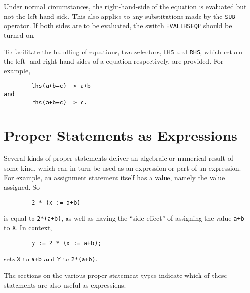 Under normal circumstances, the right-hand-side of the equation is
evaluated but not the left-hand-side.  This also applies to any substitutions
made by the {\tt SUB} operator.  If both sides are to be
evaluated, the switch {\tt EVALLHSEQP} should be
turned on.

To facilitate the handling of equations, two selectors, {\tt LHS}
 and {\tt RHS}, which return the left- and
right-hand sides of a equation respectively, are provided.
For example,
\begin{verbatim}
        lhs(a+b=c) -> a+b
and
        rhs(a+b=c) -> c.
\end{verbatim}

\section{Proper Statements as Expressions}

Several kinds of proper statements deliver
an algebraic or numerical result of some kind, which can in turn be used as
an expression or part of an expression.  For example, an assignment
statement itself has a value, namely the value assigned.  So
\begin{verbatim}
        2 * (x := a+b)
\end{verbatim}
is equal to {\tt 2*(a+b)}, as well as having the ``side-effect'' of assigning the value {\tt a+b} to {\tt X}.  In context,
\begin{verbatim}
        y := 2 * (x := a+b);
\end{verbatim}
sets {\tt X} to {\tt a+b} and {\tt Y} to {\tt 2*(a+b)}.

The sections on the various proper statement types
indicate which of these statements are also useful as expressions.


